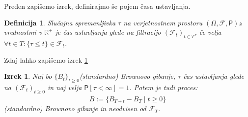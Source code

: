 \documentclass[11pt]{article}
\newtheorem{izrek}{Izrek}
\newtheorem{definicija}{Definicija}
\newcommand{\f}{\mathcal{F}}
\begin{document}
    Preden zapišemo izrek, definirajmo še pojem časa ustavljanja.
    
\begin{definicija}
	Slučajna spremenljivka $\tau$ na verjetnostnem prostoru $(\Omega, \f, \mathsf{P})$z vrednostmi v $\mathbb{R}^+$
    je \emph{čas ustavljanja} glede na filtracijo $(\f_t)_{t\in T}$, če velja $\forall t \in T:\{\tau\le t\}\in \f_t$.
\end{definicija}
    
	Zdaj lahko zapišemo izrek \ref{thm:stopped_brownian} %
    
\begin{izrek}
	Naj bo $\{B_t\}_{t \geq 0}$\label{thm:stopped_brownian} (standardno) Brownovo gibanje, $\tau$ čas ustavljanja glede na 
    $(\f_t)_{t \geq 0}$ in naj velja $\mathsf{P}[\tau<\infty]=1$.
    Potem je tudi proces:
    \[
    \hat{B} := \{B_{T+t} - B_T \mid t \geq 0\}
    \]
    (standardno) Brownovo gibanje in neodvisen od $\f_T$.
\end{izrek}



\end{document}
